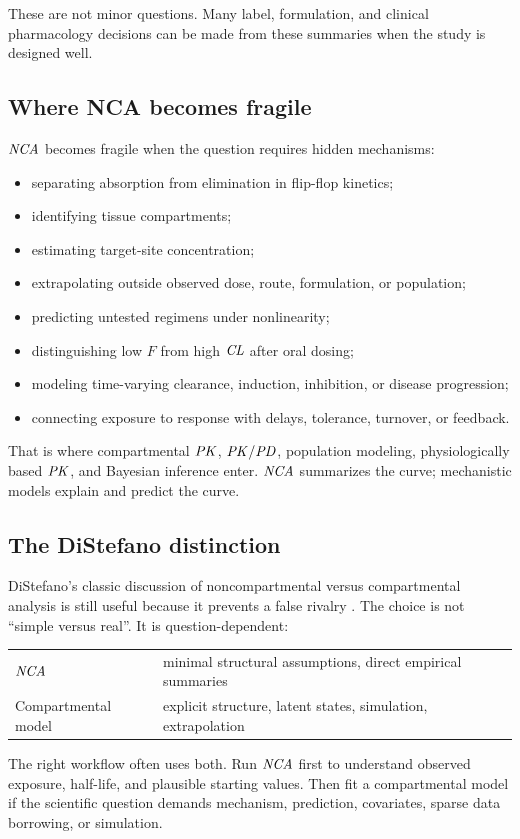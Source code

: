 \documentclass[a4paper]{article}
\newcommand{\CL}{\ensuremath{\pksym{CL}}}
\newcommand{\PK}{\ensuremath{\pksym{PK}}}
\newcommand{\PKPD}{\ensuremath{\pksym{PK}/\pksym{PD}}}
\newcommand{\NCA}{\ensuremath{\pksym{NCA}}}
\begin{document}
These are not minor questions. Many label, formulation, and clinical pharmacology decisions can be made from these summaries when the study is designed well.

\subsection{Where NCA becomes fragile}

\NCA{} becomes fragile when the question requires hidden mechanisms:
\begin{itemize}[leftmargin=2em]
  \item separating absorption from elimination in flip-flop kinetics;
  \item identifying tissue compartments;
  \item estimating target-site concentration;
  \item extrapolating outside observed dose, route, formulation, or population;
  \item predicting untested regimens under nonlinearity;
  \item distinguishing low \(F\) from high \CL{} after oral dosing;
  \item modeling time-varying clearance, induction, inhibition, or disease progression;
  \item connecting exposure to response with delays, tolerance, turnover, or feedback.
\end{itemize}

That is where compartmental \PK{}, \PKPD{}, population modeling, physiologically based \PK{}, and Bayesian inference enter. \NCA{} summarizes the curve; mechanistic models explain and predict the curve.

\subsection{The DiStefano distinction}

DiStefano's classic discussion of noncompartmental versus compartmental analysis is still useful because it prevents a false rivalry \cite{distefano1982Noncompartmental}. The choice is not ``simple versus real''. It is question-dependent:
\begin{center}
\begin{tabularx}{0.92\textwidth}{lX}
\toprule
\NCA{} & minimal structural assumptions, direct empirical summaries\\
Compartmental model & explicit structure, latent states, simulation, extrapolation\\
\bottomrule
\end{tabularx}
\end{center}
The right workflow often uses both. Run \NCA{} first to understand observed exposure, half-life, and plausible starting values. Then fit a compartmental model if the scientific question demands mechanism, prediction, covariates, sparse data borrowing, or simulation.
\end{document}
